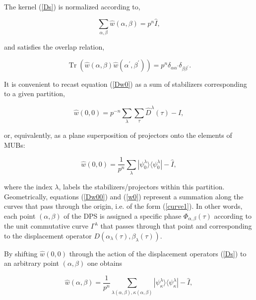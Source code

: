\documentclass[quantumrep,article,submit,pdftex,moreauthors]{Definitions/mdpi}
\DeclareMathOperator{\Tr}{Tr}
\begin{document}
The kernel (\ref{Ds}) is normalized according to, 

\begin{equation}
  \sum_{\alpha,\beta}\hat{w}\left(\alpha,\beta\right) = p^{n}\hat{I},
\end{equation}

and satisfies the overlap relation, 

\begin{equation}
  \Tr\left(
    \hat{w}(\alpha,\beta)\hat{w}(\alpha^{\prime},\beta^{\prime})
  \right)
  = p^{n} \delta_{\alpha \alpha^{\prime}} \delta_{\beta \beta^{\prime}}.
\end{equation}

It is convenient to recast equation (\ref{Dw0}) as a sum of stabilizers
corresponding to a given partition, 

\begin{equation}
  \hat{w}\left(0,0\right)
  = p^{-n} \sum_{\lambda} \sum_{\tau} \hat{D}^{\lambda}(\tau)-\hat{I},
  \label{Dw00}
\end{equation}

or, equivalently, as a plane superposition of projectors onto the elements of
MUBs:

\begin{equation}
  \hat{w}\left(0,0\right)
  = \frac{1}{p^{n}} \sum_{\lambda}
  |\psi_{0}^{\lambda}\rangle \langle \psi_{0}^{\lambda }|
  - \hat{I},
  \label{w0}
\end{equation}

where the index $\lambda$, labels the stabilizers/projectors within this
partition. Geometrically, equations (\ref{Dw00}) and (\ref{w0}) represent a
summation along the curves that pass through the origin, i.e. of the form
(\ref{curve1}). In other words, each point $(\alpha,\beta)$ of the DPS is assigned
a specific phase $\Phi_{\alpha,\beta } \left( \tau \right)$ according to the
unit commutative curve $\Gamma^{\lambda}$ that passes through that point and
corresponding to the displacement operator $D\left(\alpha_{\lambda }(\tau
),\beta_{\lambda }(\tau)\right)$.

By shifting $\hat{w}\left(0,0\right)$ through the action of the
displacement operators (\ref{Ds}) to an arbitrary point $(\alpha,\beta )$
one obtains 

\begin{equation}
  \hat{w}(\alpha,\beta)
  = \frac{1}{p^{n}} \sum_{\lambda (\alpha,\beta),\kappa(\alpha ,\beta )}
  |\psi_{\kappa}^{\lambda}\rangle \langle \psi_{\kappa}^{\lambda }|
  - \hat{I},
  \label{wab}
\end{equation}
\end{document}
